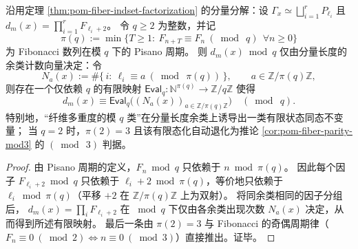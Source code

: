 \begin{corollary}\label{cor:pom-fiber-modq-pisano-invariant}
沿用定理 \ref{thm:pom-fiber-indset-factorization} 的分量分解：设
\(
\Gamma_x\simeq\bigsqcup_{i=1}^r P_{\ell_i}
\)
且
\(
d_m(x)=\prod_{i=1}^r F_{\ell_i+2}
\)。
令 \(q\ge 2\) 为整数，并记
\[
\pi(q):=\min\{T\ge 1:\ F_{n+T}\equiv F_n\ (\bmod\ q)\ \ \forall n\ge 0\}
\]
为 Fibonacci 数列在模 \(q\) 下的 Pisano 周期。
则 \(d_m(x)\bmod q\) 仅由分量长度的余类计数向量决定：令
\[
N_a(x):=\#\{\,i:\ \ell_i\equiv a\ (\bmod\ \pi(q))\,\},
\qquad a\in \mathbb{Z}/\pi(q)\mathbb{Z},
\]
则存在一个仅依赖 \(q\) 的有限映射
\(
\mathsf{Eval}_q:\mathbb{N}^{\pi(q)}\to \mathbb{Z}/q\mathbb{Z}
\)
使得
\[
\boxed{\;
d_m(x)\equiv \mathsf{Eval}_q\bigl((N_a(x))_{a\in\mathbb{Z}/\pi(q)\mathbb{Z}}\bigr)\quad(\bmod\ q).\;}
\]
特别地，“纤维多重度的模 \(q\) 类”在分量长度余类上诱导出一类有限状态同态不变量；
当 \(q=2\) 时，\(\pi(2)=3\) 且该有限态化自动退化为推论 \ref{cor:pom-fiber-parity-mod3} 的 \((\bmod\ 3)\) 判据。
\end{corollary}
\begin{proof}
由 Pisano 周期的定义，\(F_n\bmod q\) 只依赖于 \(n\bmod \pi(q)\)。
因此每个因子 \(F_{\ell_i+2}\bmod q\) 只依赖于 \(\ell_i+2\bmod \pi(q)\)，等价地只依赖于 \(\ell_i\bmod \pi(q)\)（平移 \(+2\) 在 \(\mathbb{Z}/\pi(q)\mathbb{Z}\) 上为双射）。
将同余类相同的因子分组后，
\(
d_m(x)=\prod_i F_{\ell_i+2}
\)
在 \(\bmod q\) 下仅由各余类出现次数 \(N_a(x)\) 决定，从而得到所述有限映射。
最后一条由 \(\pi(2)=3\) 与 Fibonacci 的奇偶周期律（\(F_n\equiv 0\ (\bmod 2)\iff n\equiv 0\ (\bmod 3)\)）直接推出。证毕。
\end{proof}

\endinput
